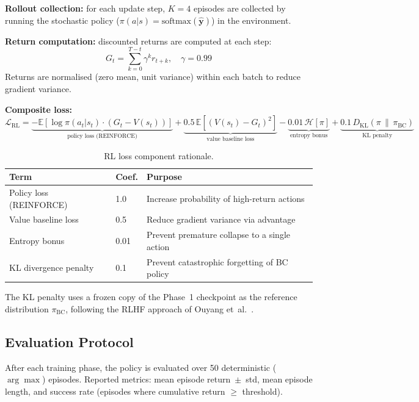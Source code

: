 \documentclass[12pt, a4paper]{article}
\begin{document}
\textbf{Rollout collection:} for each update step, $K=4$ episodes are
collected by running the stochastic policy ($\pi(a|s) = \mathrm{softmax}(\hat{\mathbf{y}})$)
in the environment.

\textbf{Return computation:} discounted returns are computed at each step:
\[
  G_t = \sum_{k=0}^{T-t} \gamma^k r_{t+k}, \quad \gamma = 0.99
\]
Returns are normalised (zero mean, unit variance) within each batch to
reduce gradient variance.

\textbf{Composite loss:}
\[
  \mathcal{L}_\text{RL} =
    \underbrace{-\mathbb{E}\!\left[\log\pi(a_t|s_t)\cdot(G_t - V(s_t))\right]}_{\text{policy loss (REINFORCE)}}
    + \underbrace{0.5\,\mathbb{E}\!\left[(V(s_t)-G_t)^2\right]}_{\text{value baseline loss}}
    - \underbrace{0.01\,\mathcal{H}[\pi]}_{\text{entropy bonus}}
    + \underbrace{0.1\,D_\text{KL}(\pi \,\|\, \pi_\text{BC})}_{\text{KL penalty}}
\]

\begin{table}[h]
\centering
\caption{RL loss component rationale.}
\begin{tabular}{L{3.5cm} L{2cm} L{7cm}}
\toprule
\textbf{Term} & \textbf{Coef.} & \textbf{Purpose} \\
\midrule
Policy loss (REINFORCE) & 1.0 & Increase probability of high-return actions \\
Value baseline loss     & 0.5 & Reduce gradient variance via advantage \\
Entropy bonus           & 0.01 & Prevent premature collapse to a single action \\
KL divergence penalty   & 0.1  & Prevent catastrophic forgetting of BC policy \\
\bottomrule
\end{tabular}
\end{table}

The KL penalty uses a frozen copy of the Phase~1 checkpoint as the reference
distribution $\pi_\text{BC}$, following the RLHF approach of
Ouyang et~al.~\cite{ouyang2022rlhf}.

\subsection{Evaluation Protocol}

After each training phase, the policy is evaluated over 50 deterministic
($\arg\max$) episodes.
Reported metrics: mean episode return~$\pm$~std, mean episode length, and
success rate (episodes where cumulative return $\geq$ threshold).
\end{document}
